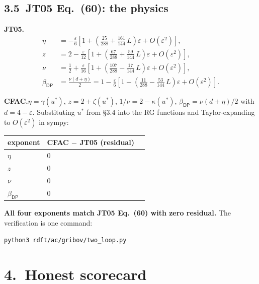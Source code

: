 \documentclass[11pt,a4paper]{article}
\begin{document}
\subsection*{3.5\ JT05 Eq.~(60): the physics}

\textbf{JT05.}\quad
\begin{align*}
\eta &= -\tfrac{\varepsilon}{6}\!\left[1 + \!\left(\tfrac{25}{288} + \tfrac{161}{144}\,L\right)\!\varepsilon + O(\varepsilon^2)\right],\\
z    &= 2 - \tfrac{\varepsilon}{12}\!\left[1 + \!\left(\tfrac{67}{288} + \tfrac{59}{144}\,L\right)\!\varepsilon + O(\varepsilon^2)\right],\\
\nu  &= \tfrac{1}{2} + \tfrac{\varepsilon}{16}\!\left[1 + \!\left(\tfrac{107}{288} - \tfrac{17}{144}\,L\right)\!\varepsilon + O(\varepsilon^2)\right],\\
\beta_{\textsf{DP}} &= \tfrac{\nu(d+\eta)}{2} = 1 - \tfrac{\varepsilon}{6}\!\left[1 - \!\left(\tfrac{11}{288} - \tfrac{53}{144}\,L\right)\!\varepsilon + O(\varepsilon^2)\right].
\end{align*}

\textbf{CFAC.}\quad $\eta = \gamma(u^*)$, $z = 2 + \zeta(u^*)$, $1/\nu = 2 - \kappa(u^*)$, $\beta_{\textsf{DP}} = \nu(d+\eta)/2$ with $d = 4-\varepsilon$. Substituting $u^*$ from §3.4 into the RG functions and Taylor-expanding to $O(\varepsilon^2)$ in sympy:
\begin{center}
\begin{tabular}{@{}lll@{}}
\toprule
exponent & CFAC $-$ JT05 (residual) \\
\midrule
$\eta$            & $0$ \\
$z$               & $0$ \\
$\nu$             & $0$ \\
$\beta_{\textsf{DP}}$ & $0$ \\
\bottomrule
\end{tabular}
\end{center}
\textbf{All four exponents match JT05 Eq.~(60) with zero residual.} The verification is one command:
\begin{center}
\texttt{python3 rdft/ac/gribov/two\_loop.py}
\end{center}

\section*{4.\ Honest scorecard}
\end{document}
